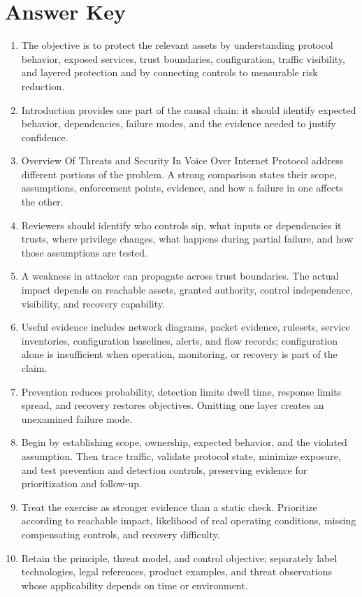 \documentclass[11pt]{article}
\begin{document}
\section*{Answer Key}
\begin{enumerate}
\item The objective is to protect the relevant assets by understanding protocol behavior, exposed services, trust boundaries, configuration, traffic visibility, and layered protection and by connecting controls to measurable risk reduction.
\item Introduction provides one part of the causal chain: it should identify expected behavior, dependencies, failure modes, and the evidence needed to justify confidence.
\item Overview Of Threats and Security In Voice Over Internet Protocol address different portions of the problem. A strong comparison states their scope, assumptions, enforcement points, evidence, and how a failure in one affects the other.
\item Reviewers should identify who controls sip, what inputs or dependencies it trusts, where privilege changes, what happens during partial failure, and how those assumptions are tested.
\item A weakness in attacker can propagate across trust boundaries. The actual impact depends on reachable assets, granted authority, control independence, visibility, and recovery capability.
\item Useful evidence includes network diagrams, packet evidence, rulesets, service inventories, configuration baselines, alerts, and flow records; configuration alone is insufficient when operation, monitoring, or recovery is part of the claim.
\item Prevention reduces probability, detection limits dwell time, response limits spread, and recovery restores objectives. Omitting one layer creates an unexamined failure mode.
\item Begin by establishing scope, ownership, expected behavior, and the violated assumption. Then trace traffic, validate protocol state, minimize exposure, and test prevention and detection controls, preserving evidence for prioritization and follow-up.
\item Treat the exercise as stronger evidence than a static check. Prioritize according to reachable impact, likelihood of real operating conditions, missing compensating controls, and recovery difficulty.
\item Retain the principle, threat model, and control objective; separately label technologies, legal references, product examples, and threat observations whose applicability depends on time or environment.
\end{enumerate}
\end{document}
